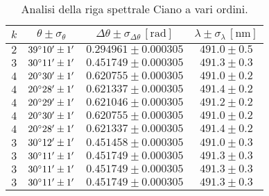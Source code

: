 \documentclass[]{article}
\begin{document}
    \begin{table}[H]
        \centering
        \begin{tabular}{||c|c|c|c||}
            \hline
            $k$ & $\theta \pm \sigma_{\theta}$ & $\Delta\theta \pm \sigma_{\Delta\theta} \, \left[\text{rad}\right]$ & $\lambda \pm \sigma_{\lambda} \, \left[\text{nm}\right]$ \\\hline
            \hline
            $2$ & $39\degree 10' \pm 1'$ & $0.294961 \pm 0.000305$ & $491.0 \pm 0.5$ \\\hline
            $3$ & $30\degree 11' \pm 1'$ & $0.451749 \pm 0.000305$ & $491.3 \pm 0.3$ \\\hline
            $4$ & $20\degree 30' \pm 1'$ & $0.620755 \pm 0.000305$ & $491.0 \pm 0.2$ \\\hline
            $4$ & $20\degree 28' \pm 1'$ & $0.621337 \pm 0.000305$ & $491.4 \pm 0.2$ \\\hline
            $4$ & $20\degree 29' \pm 1'$ & $0.621046 \pm 0.000305$ & $491.2 \pm 0.2$ \\\hline
            $4$ & $20\degree 30' \pm 1'$ & $0.620755 \pm 0.000305$ & $491.0 \pm 0.2$ \\\hline
            $4$ & $20\degree 28' \pm 1'$ & $0.621337 \pm 0.000305$ & $491.4 \pm 0.2$ \\\hline
            $3$ & $30\degree 12' \pm 1'$ & $0.451458 \pm 0.000305$ & $491.0 \pm 0.3$ \\\hline
            $3$ & $30\degree 11' \pm 1'$ & $0.451749 \pm 0.000305$ & $491.3 \pm 0.3$ \\\hline
            $3$ & $30\degree 11' \pm 1'$ & $0.451749 \pm 0.000305$ & $491.3 \pm 0.3$ \\\hline
            $3$ & $30\degree 11' \pm 1'$ & $0.451749 \pm 0.000305$ & $491.3 \pm 0.3$ \\\hline
        \end{tabular}
        \caption{Analisi della riga spettrale Ciano a vari ordini.}
        \label{ciano}
    \end{table}
\end{document}

